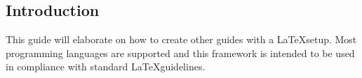 \subsection{Introduction}

This guide will elaborate on how to create other guides with a \LaTeX  setup. Most programming languages are supported and this framework is intended to be used in compliance with standard \LaTeX  guidelines. 

